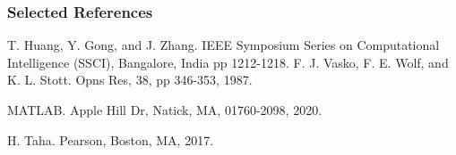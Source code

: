 \documentclass[graphics]{beamer}
\begin{document}
\begin{frame}
\frametitle{Selected References}
\begin{thebibliography}{99}
\tiny

T. Huang, Y. Gong, and J. Zhang.
 IEEE Symposium Series on Computational Intelligence (SSCI), Bangalore, India pp 1212-1218.
F. J. Vasko, F. E. Wolf, and K. L. Stott.
\newblock Opns Res, 38, pp 346-353, 1987.

MATLAB.
 Apple Hill Dr, Natick, MA, 01760-2098, 2020.

H. Taha.
\newblock Pearson, Boston, MA, 2017.

\end{thebibliography}
\end{frame}
\end{document}

